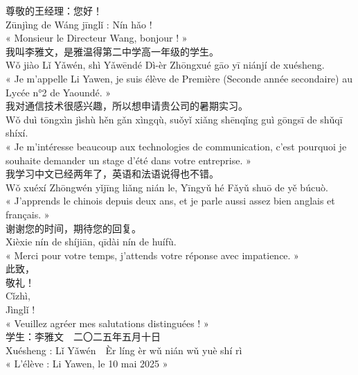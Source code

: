 \documentclass[11pt]{article}
\begin{document}
\begin{textebox}
尊敬的王经理：您好！\\
Zūnjìng de Wáng jīnglǐ : Nín hǎo !\\
« Monsieur le Directeur Wang, bonjour ! »\\[4pt]
我叫李雅文，是雅温得第二中学高一年级的学生。\\
Wǒ jiào Lǐ Yǎwén, shì Yǎwēndé Dì-èr Zhōngxué gāo yī niánjí de xuésheng.\\
« Je m'appelle Li Yawen, je suis élève de Première (Seconde année secondaire) au Lycée n°2 de Yaoundé. »\\[4pt]
我对通信技术很感兴趣，所以想申请贵公司的暑期实习。\\
Wǒ duì tōngxìn jìshù hěn gǎn xìngqù, suǒyǐ xiǎng shēnqǐng guì gōngsī de shǔqī shíxí.\\
« Je m'intéresse beaucoup aux technologies de communication, c'est pourquoi je souhaite demander un stage d'été dans votre entreprise. »\\[4pt]
我学习中文已经两年了，英语和法语说得也不错。\\
Wǒ xuéxí Zhōngwén yǐjīng liǎng nián le, Yīngyǔ hé Fǎyǔ shuō de yě búcuò.\\
« J'apprends le chinois depuis deux ans, et je parle aussi assez bien anglais et français. »\\[4pt]
谢谢您的时间，期待您的回复。\\
Xièxie nín de shíjiān, qīdài nín de huífù.\\
« Merci pour votre temps, j'attends votre réponse avec impatience. »\\[4pt]
此致，\\
敬礼！\\
Cǐzhì,\\
Jìnglǐ !\\
« Veuillez agréer mes salutations distinguées ! »\\[4pt]
学生：李雅文　二〇二五年五月十日\\
Xuésheng : Lǐ Yǎwén　Èr líng èr wǔ nián wǔ yuè shí rì\\
« L'élève : Li Yawen, le 10 mai 2025 »
\end{textebox}
\end{document}
